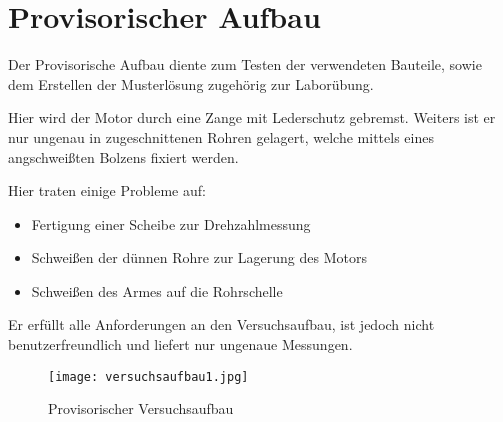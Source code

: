 \section{Provisorischer Aufbau}
\label{provi}

Der Provisorische Aufbau diente zum Testen der verwendeten Bauteile, sowie dem Erstellen der Musterlösung zugehörig zur Laborübung.

Hier wird der Motor durch eine Zange mit Lederschutz gebremst.
Weiters ist er nur ungenau in zugeschnittenen Rohren gelagert, welche mittels eines angschweißten Bolzens fixiert werden.

Hier traten einige Probleme auf:

\begin{itemize}
    \item Fertigung einer Scheibe zur Drehzahlmessung
    \item Schweißen der dünnen Rohre zur Lagerung des Motors
    \item Schweißen des Armes auf die Rohrschelle
\end{itemize}

Er erfüllt alle Anforderungen an den Versuchsaufbau, ist jedoch nicht benutzerfreundlich und liefert nur ungenaue Messungen.

\begin{figure}[H]
    \begin{center}
        \texttt{[image: versuchsaufbau1.jpg]}
        \caption{Provisorischer Versuchsaufbau}
    \end{center}
\end{figure}